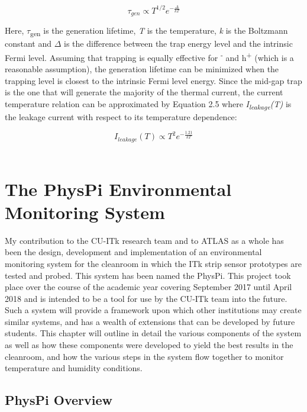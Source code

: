 \documentclass[letterpaper, 11pt]{report}
\begin{document}
\begin{equation}
\tau_{gen}     \propto    T^{1/2} e^{-\frac{\Delta}{kT}}
\end{equation}

Here, $\tau$\textsubscript{gen} is the generation lifetime, \textit{T} is the temperature, \textit{k} is the Boltzmann constant and $\Delta$ is the difference between the trap energy level and the intrinsic Fermi level.  Assuming that trapping is equally effective for \textsuperscript{-} and h\textsuperscript{+} (which is a reasonable assumption), the generation lifetime can be minimized when the trapping level is closest to the intrinsic Fermi level energy.  Since the mid-gap trap is the one that will generate the majority of the thermal current, the current temperature relation can be approximated by Equation 2.5 where \textit{I\textsubscript{leakage}(T)} is the leakage current with respect to its temperature dependence:

\begin{equation}
I_{leakage}(T)   \propto   T^{2} e^{-\frac{1.21}{kT}}
\end{equation}\\

\chapter{The PhysPi Environmental Monitoring System}

My contribution to the CU-ITk research team and to ATLAS as a whole has been the design, development and implementation of an environmental monitoring system for the cleanroom in which the ITk strip sensor prototypes are tested and probed. This system has been named the PhysPi.  This project took place over the course of the academic year covering September 2017 until April 2018 and is intended to be a tool for use by the CU-ITk team into the future.  Such a system will provide a framework upon which other institutions may create similar systems, and has a wealth of extensions that can be developed by future students.  This chapter will outline in detail the various components of the system as well as how these components were developed to yield the best results in the cleanroom, and how the various steps in the system flow together to monitor temperature and humidity conditions.

\section{PhysPi Overview}
\end{document}
